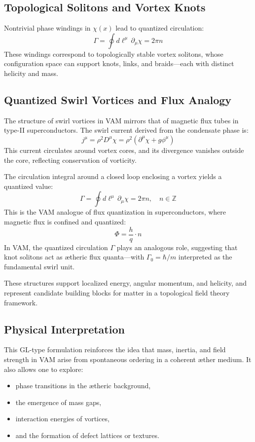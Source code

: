 \subsection{Topological Solitons and Vortex Knots}
Nontrivial phase windings in $\chi(x)$ lead to quantized circulation:
\begin{equation}
    \Gamma = \oint d\ell^\mu \, \partial_\mu \chi = 2\pi n
\end{equation}
These windings correspond to topologically stable vortex solitons, whose configuration space can support knots, links, and braids---each with distinct helicity and mass.

\subsection{Quantized Swirl Vortices and Flux Analogy}
The structure of swirl vortices in VAM mirrors that of magnetic flux tubes in type-II superconductors. The swirl current derived from the condensate phase is:
\begin{equation}
    j^\mu = \rho^2 D^\mu \chi = \rho^2 (\partial^\mu \chi + g \phi^\mu)
\end{equation}
This current circulates around vortex cores, and its divergence vanishes outside the core, reflecting conservation of vorticity.

The circulation integral around a closed loop enclosing a vortex yields a quantized value:
\begin{equation}
    \Gamma = \oint d\ell^\mu \, \partial_\mu \chi = 2\pi n, \quad n \in \mathbb{Z}
\end{equation}
This is the VAM analogue of flux quantization in superconductors, where magnetic flux is confined and quantized:
\begin{equation}
    \Phi = \frac{h}{q} \cdot n
\end{equation}
In VAM, the quantized circulation $\Gamma$ plays an analogous role, suggesting that knot solitons act as ætheric flux quanta---with $\Gamma_0 = \hbar / m$ interpreted as the fundamental swirl unit.

These structures support localized energy, angular momentum, and helicity, and represent candidate building blocks for matter in a topological field theory framework.

\subsection{Physical Interpretation}
This GL-type formulation reinforces the idea that mass, inertia, and field strength in VAM arise from spontaneous ordering in a coherent æther medium. It also allows one to explore:
\begin{itemize}
    \item phase transitions in the ætheric background,
    \item the emergence of mass gaps,
    \item interaction energies of vortices,
    \item and the formation of defect lattices or textures.
\end{itemize}

